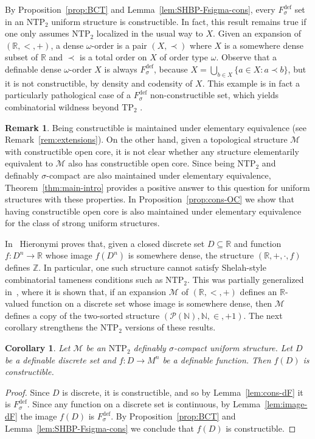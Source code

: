 \documentclass[12pt]{article}
\newcommand{\Mm}{\mathcal{M}}
\newcommand{\dF}{\ensuremath{F_\sigma^{\text{def}}}}
\newcommand{\R}{\mathbb{R}}
\newcommand{\N}{\mathbb{N}}
\newcommand{\Z}{\mathbb{Z}}
\newcommand{\NTP}{\ensuremath{\mathrm{NTP}_2}}
\newcommand{\TP}{\ensuremath{\mathrm{TP}_2}}
\newtheorem{corollary}[theorem]{Corollary}
\theoremstyle{definition}
\newtheorem{remark}[theorem]{Remark}
\theoremstyle{remark}
\begin{document}
By Proposition~\ref{prop:BCT} and Lemma~\ref{lem:SHBP-Fsigma-cons}, every $\dF$ set in an $\NTP$ uniform structure is constructible. In fact, this result remains true if one only assumes $\NTP$ localized in the usual way to $X$. Given an expansion of $(\R,<,+)$, a dense $\omega$-order is a pair $(X,\prec)$ where $X$ is a somewhere dense subset of $\R$ and $\prec$ is a total order on $X$ of order type $\omega$. Observe that a definable dense $\omega$-order $X$ is always $\dF$, because $X=\bigcup_{b\in X} \{ a\in X : a \prec b\}$, but it is not constructible, by density and codensity of $X$. This example is in fact a particularly pathological case of a $\dF$ non-constructible set, which yields combinatorial wildness beyond $\TP$ \cite{HW18}. 

\begin{remark}\label{rem:T-open-core}
Being constructible is maintained under elementary equivalence (see Remark~\ref{rem:extensions}). On the other hand, given a topological structure $\Mm$ with constructible open core, it is not clear whether any structure elementarily equivalent to $\Mm$ also has constructible open core. Since being $\NTP$ and definably $\sigma$-compact are also maintained under elementary equivalence, Theorem~\ref{thm:main-intro} provides a positive answer to this question for uniform structures with these properties. In Proposition~\ref{prop:cons-OC} we show that having constructible open core is also maintained under elementary equivalence for the class of strong uniform structures.
\end{remark}

In~\cite{Hie10} Hieronymi proves that, given a closed discrete set $D\subseteq \R$ and function $f:D^n\rightarrow \R$ whose image $f(D^n)$ is somewhere dense, the structure $(\R,+,\cdot, f)$ defines $\Z$. In particular, one such structure cannot satisfy Shelah-style combinatorial tameness conditions such as $\NTP$. This was partially generalized in~\cite[Theorem C]{HW18}, where it is shown that, if an expansion $\Mm$ of $(\R,<,+)$ defines an $\R$-valued function on a discrete set whose image is somewhere dense, then $\Mm$ defines a copy of the two-sorted structure $(\mathcal{P}(\N), \N, \in, +1)$. The next corollary strengthens the $\NTP$ versions of these results. 

\begin{corollary}\label{cor:disc-non-cons}
Let $\Mm$ be an \NTP{} definably $\sigma$-compact uniform structure. Let $D$ be a definable discrete set and $f:D\rightarrow M^n$ be a definable function. Then $f(D)$ is constructible. 
\end{corollary}
\begin{proof}
Since $D$ is discrete, it is constructible, and so by Lemma~\ref{lem:cons-dF} it is $\dF$. Since any function on a discrete set is continuous, by Lemma~\ref{lem:image-dF} the image $f(D)$ is $\dF$. By Proposition~\ref{prop:BCT} and Lemma~\ref{lem:SHBP-Fsigma-cons} we conclude that $f(D)$ is constructible. 
\end{proof}
\end{document}
